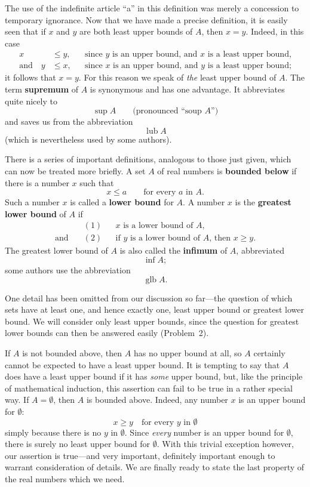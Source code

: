 The use of the indefinite article ``a'' in this definition was merely a
concession to temporary ignorance. Now that we have made a precise
definition, it is easily seen that if $x$ and $y$ are both least upper bounds
of $A$, then $x = y$. Indeed, in this case
\begin{align*}
x &\leq y, && \text{since $y$ is an upper bound, and $x$ is a least upper bound,}\\
\text{and}\quad
y &\leq x, && \text{since $x$ is an upper bound, and $y$ is a least upper bound;}
\end{align*}
it follows that $x = y$. For this reason we speak of \emph{the} least upper
bound of $A$. The term \textbf{supremum} of $A$ is synonymous and has one
advantage. It abbreviates quite nicely to
\[
\sup A \qquad\text{(pronounced ``soup $A$'')}
\]
and saves us from the abbreviation
\[
\operatorname{lub} A
\]
(which is nevertheless used by some authors).

There is a series of important definitions, analogous to those just given,
which can now be treated more briefly. A set $A$ of real numbers is
\textbf{bounded below} if there is a number $x$ such that
\[
x \leq a \qquad\text{for every $a$ in $A$.}
\]
Such a number $x$ is called a \textbf{lower bound} for $A$. A number $x$ is
the \textbf{greatest lower bound} of $A$ if
\begin{align*}
&(1) && \text{$x$ is a lower bound of $A$,}\\
\text{and}\quad &(2) && \text{if $y$ is a lower bound of $A$, then $x \geq y$.}
\end{align*}
The greatest lower bound of $A$ is also called the \textbf{infimum} of $A$,
abbreviated
\[
\inf A;
\]
some authors use the abbreviation
\[
\operatorname{glb} A.
\]

One detail has been omitted from our discussion so far---the question of
which sets have at least one, and hence exactly one, least upper bound or
greatest lower bound. We will consider only least upper bounds, since the
question for greatest lower bounds can then be answered easily (Problem~2).

If $A$ is not bounded above, then $A$ has no upper bound at all, so $A$
certainly cannot be expected to have a least upper bound. It is tempting to
say that $A$ does have a least upper bound if it has \emph{some} upper bound,
but, like the principle of mathematical induction, this assertion can fail to
be true in a rather special way. If $A = \emptyset$, then $A$ is bounded
above. Indeed, any number $x$ is an upper bound for $\emptyset$:
\[
x \geq y \quad\text{for every $y$ in $\emptyset$}
\]
simply because there is no $y$ in $\emptyset$. Since \emph{every} number is
an upper bound for $\emptyset$, there is surely no least upper bound for
$\emptyset$. With this trivial exception however, our assertion is
true---and very important, definitely important enough to warrant
consideration of details. We are finally ready to state the last property of
the real numbers which we need.

